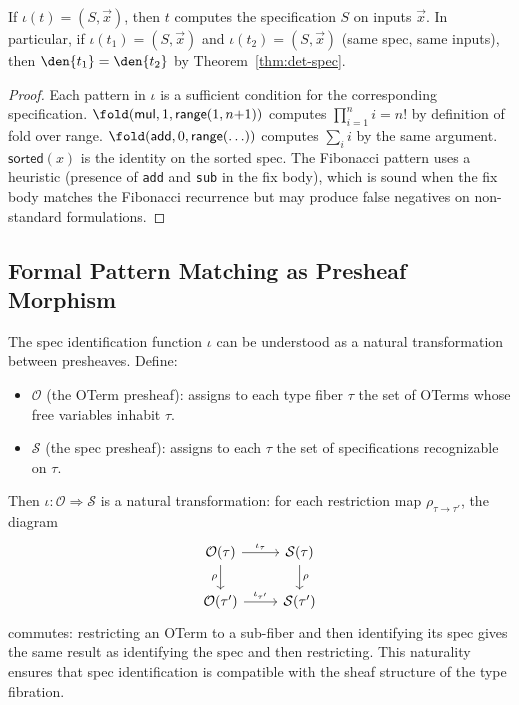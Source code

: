 \begin{proposition}
\label{prop:spec-id-sound}
If $\iota(t) = (S, \vec{x})$, then $t$ computes the specification
$S$ on inputs $\vec{x}$.  In particular, if $\iota(t_1) = (S, \vec{x})$
and $\iota(t_2) = (S, \vec{x})$ (same spec, same inputs), then
$\den{t_1} = \den{t_2}$ by Theorem~\ref{thm:det-spec}.
\end{proposition}

\begin{proof}
Each pattern in $\iota$ is a sufficient condition for the
corresponding specification.
$\fold(\mathsf{mul}, 1, \mathsf{range}(1, n{+}1))$ computes
$\prod_{i=1}^n i = n!$ by definition of fold over range.
$\fold(\mathsf{add}, 0, \mathsf{range}(\ldots))$ computes
$\sum_{i} i$ by the same argument.
$\mathsf{sorted}(x)$ is the identity on the sorted spec.
The Fibonacci pattern uses a heuristic (presence of \texttt{add}
and \texttt{sub} in the fix body), which is sound when the fix
body matches the Fibonacci recurrence but may produce false
negatives on non-standard formulations.
\end{proof}


\subsection{Formal Pattern Matching as Presheaf Morphism}

The spec identification function $\iota$ can be understood as a
natural transformation between presheaves.  Define:
\begin{itemize}
  \item $\mathcal{O}$ (the OTerm presheaf): assigns to each type
    fiber $\tau$ the set of OTerms whose free variables inhabit
    $\tau$.
  \item $\mathcal{S}$ (the spec presheaf): assigns to each $\tau$
    the set of specifications recognizable on $\tau$.
\end{itemize}

Then $\iota : \mathcal{O} \Rightarrow \mathcal{S}$ is a natural
transformation: for each restriction map $\rho_{\tau \to \tau'}$,
the diagram
\[
  \begin{tikzcd}
    \mathcal{O}(\tau) \ar[r, "\iota_\tau"] \ar[d, "\rho"'] &
    \mathcal{S}(\tau) \ar[d, "\rho"] \\
    \mathcal{O}(\tau') \ar[r, "\iota_{\tau'}"] &
    \mathcal{S}(\tau')
  \end{tikzcd}
\]
commutes: restricting an OTerm to a sub-fiber and then identifying
its spec gives the same result as identifying the spec and then
restricting.  This naturality ensures that spec identification
is compatible with the sheaf structure of the type fibration.



